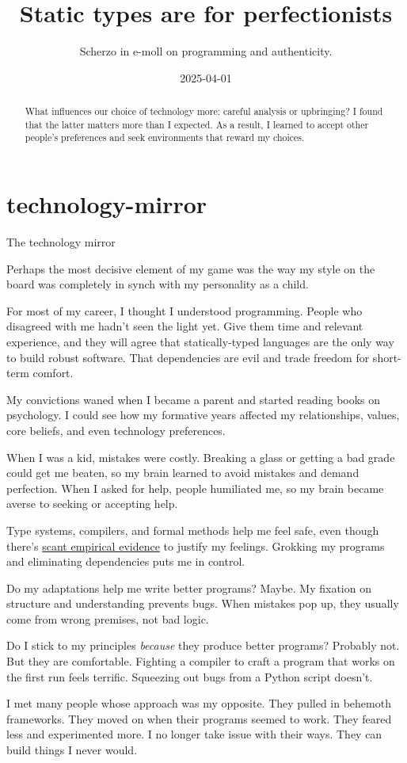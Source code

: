 \documentclass{article}
\title{Static types are for perfectionists}
\subtitle{Scherzo in e-moll on programming and authenticity.}
\date{2025-04-01}
\begin{document}
\begin{abstract}
  What influences our choice of technology more: careful analysis or upbringing?
  I found that the latter matters more than I expected.
  As a result,
  I learned to accept other people's preferences
  and seek environments that reward my choices.
\end{abstract}

\section{technology-mirror}{The technology mirror}

\epigraph{
  Perhaps the most decisive element of my game was the way my style on the board was completely in synch with my personality as a child.
}{}

For most of my career,
I thought I understood programming.
People who disagreed with me hadn't seen the light yet.
Give them time and relevant experience,
and they will agree that statically-typed languages are the only way to build robust software.
That dependencies are evil and trade freedom for short-term comfort.

My convictions waned when I became a parent and started reading books on psychology.
I could see how my formative years affected my relationships, values, core beliefs,
and even technology preferences.

When I was a kid, mistakes were costly.
Breaking a glass or getting a bad grade could get me beaten,
so my brain learned to avoid mistakes and demand perfection.
When I asked for help, people humiliated me,
so my brain became averse to seeking or accepting help.

Type systems, compilers, and formal methods help me feel safe, even though there's \href{https://danluu.com/empirical-pl/}{scant empirical evidence} to justify my feelings.
Grokking my programs and eliminating dependencies puts me in control.

Do my adaptations help me write better programs? Maybe.
My fixation on structure and understanding prevents bugs.
When mistakes pop up, they usually come from wrong premises, not bad logic.

Do I stick to my principles \emph{because} they produce better programs?
Probably not.
But they are comfortable.
Fighting a compiler to craft a program that works on the first run feels terrific.
Squeezing out bugs from a Python script doesn't.

I met many people whose approach was my opposite.
They pulled in behemoth frameworks.
They moved on when their programs seemed to work.
They feared less and experimented more.
I no longer take issue with their ways.
They can build things I never would.
\end{document}
